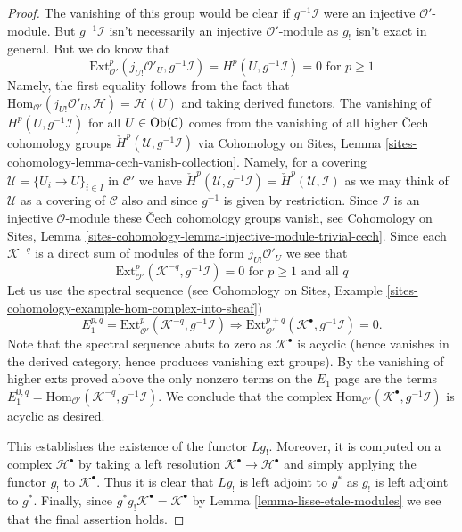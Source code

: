 \begin{proof}
\medskip\noindent
The vanishing of this group would be clear if $g^{-1}\mathcal{I}$
were an injective $\mathcal{O}'$-module. But $g^{-1}\mathcal{I}$ isn't
necessarily an injective $\mathcal{O}'$-module as $g_!$ isn't exact in
general. But we do know that
$$
\text{Ext}^p_{\mathcal{O}'}(j_{U!}\mathcal{O}'_U, g^{-1}\mathcal{I}) =
H^p(U, g^{-1}\mathcal{I}) = 0 \text{ for }p \geq 1
$$
Namely, the first equality follows from the fact that
$\text{Hom}_{\mathcal{O}'}(j_{U!}\mathcal{O}'_U, \mathcal{H}) =
\mathcal{H}(U)$ and taking derived functors. The vanishing of
$H^p(U, g^{-1}\mathcal{I})$ for all $U \in \mathop{\rm Ob}\nolimits(\mathcal{C})$
comes from the vanishing of all higher {\v C}ech cohomology groups
$\check H^p(\mathcal{U}, g^{-1}\mathcal{I})$ via
Cohomology on Sites, Lemma \ref{sites-cohomology-lemma-cech-vanish-collection}.
Namely, for a covering $\mathcal{U} = \{U_i \to U\}_{i \in I}$
in $\mathcal{C}'$ we have $\check H^p(\mathcal{U}, g^{-1}\mathcal{I}) =
\check H^p(\mathcal{U}, \mathcal{I})$ as we may think of
$\mathcal{U}$ as a covering of $\mathcal{C}$ also and since
$g^{-1}$ is given by restriction. Since $\mathcal{I}$ is an injective
$\mathcal{O}$-module these {\v C}ech cohomology groups vanish, see
Cohomology on Sites, Lemma
\ref{sites-cohomology-lemma-injective-module-trivial-cech}.
Since each $\mathcal{K}^{-q}$ is a direct sum of modules of the form
$j_{U!}\mathcal{O}'_U$ we see that
$$
\text{Ext}^p_{\mathcal{O}'}(\mathcal{K}^{-q}, g^{-1}\mathcal{I}) = 0
\text{ for }p \geq 1\text{ and all }q
$$
Let us use the spectral sequence (see
Cohomology on Sites, Example
\ref{sites-cohomology-example-hom-complex-into-sheaf})
$$
E_1^{p, q} = \text{Ext}^p_{\mathcal{O}'}(\mathcal{K}^{-q}, g^{-1}\mathcal{I})
\Rightarrow
\text{Ext}^{p + q}_{\mathcal{O}'}(\mathcal{K}^\bullet, g^{-1}\mathcal{I}) = 0.
$$
Note that the spectral sequence abuts to zero as $\mathcal{K}^\bullet$
is acyclic (hence vanishes in the derived category, hence produces
vanishing ext groups). By the vanishing of higher exts proved above
the only nonzero terms on the $E_1$ page are the terms
$E_1^{0, q} = \text{Hom}_{\mathcal{O}'}(\mathcal{K}^{-q}, g^{-1}\mathcal{I})$.
We conclude that the complex
$\text{Hom}_{\mathcal{O}'}(\mathcal{K}^\bullet, g^{-1}\mathcal{I})$
is acyclic as desired.

\medskip\noindent
This establishes the existence of the functor $Lg_!$.
Moreover, it is computed on a complex $\mathcal{H}^\bullet$
by taking a left resolution $\mathcal{K}^\bullet \to \mathcal{H}^\bullet$
and simply applying the functor $g_!$ to $\mathcal{K}^\bullet$.
Thus it is clear that $Lg_!$ is left adjoint to $g^*$ as $g_!$ is
left adjoint to $g^*$. Finally, since
$g^*g_!\mathcal{K}^\bullet = \mathcal{K}^\bullet$ by
Lemma \ref{lemma-lisse-etale-modules}
we see that the final assertion holds.
\end{proof}

